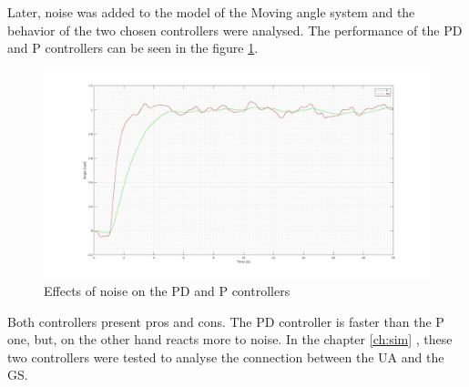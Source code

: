 Later, noise was added to the model of the Moving angle system and the behavior of the two chosen controllers were analysed. The performance of the PD and P controllers can be seen in the figure \ref{fig:noise_PID}.

\begin{figure}[H]
\centering
\includegraphics[scale=0.2]{figures/comp_PDP.jpg}
\caption{Effects of noise on the PD and P controllers}
\label{fig:noise_PID}
\end{figure}

Both controllers present pros and cons. The PD controller is faster than the P one, but, on the other hand reacts more to noise. In the chapter \ref{ch:sim} , these two controllers were tested to analyse the connection between the UA and the GS.